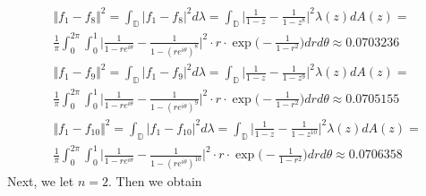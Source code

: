 \documentclass[12pt]{article}
\begin{document}
\begin{align}
&\Vert f_1 - f_8\Vert^2 = \int_\mathbb{D} \vert f_1 - f_8 \vert^2 d\lambda = \int_\mathbb{D} \bigg\vert \frac{1}{1-z} - \frac{1}{1-z^8} \bigg\vert^2 \lambda(z) dA(z) =\\
&\frac{1}{\pi} \int_0^{2\pi} \int_0^1 \bigg\vert \frac{1}{1-re^{i\theta}} - \frac{1}{1-(re^{i\theta})^8} \bigg\vert^2 \cdot r \cdot \exp\bigg(-\frac{1}{1-r^2}\bigg) dr d\theta \approx 0.0703236 \\
&\Vert f_1 - f_9\Vert^2 = \int_\mathbb{D} \vert f_1 - f_9 \vert^2 d\lambda = \int_\mathbb{D} \bigg\vert \frac{1}{1-z} - \frac{1}{1-z^9} \bigg\vert^2 \lambda(z) dA(z) =\\
&\frac{1}{\pi} \int_0^{2\pi} \int_0^1 \bigg\vert \frac{1}{1-re^{i\theta}} - \frac{1}{1-(re^{i\theta})^9} \bigg\vert^2 \cdot r \cdot \exp\bigg(-\frac{1}{1-r^2}\bigg) dr d\theta \approx 0.0705155 \\
&\Vert f_1 - f_{10}\Vert^2 = \int_\mathbb{D} \vert f_1 - f_{10} \vert^2 d\lambda = \int_\mathbb{D} \bigg\vert \frac{1}{1-z} - \frac{1}{1-z^{10}} \bigg\vert^2 \lambda(z) dA(z) =\\
&\frac{1}{\pi} \int_0^{2\pi} \int_0^1 \bigg\vert \frac{1}{1-re^{i\theta}} - \frac{1}{1-(re^{i\theta})^{10}} \bigg\vert^2 \cdot r \cdot \exp\bigg(-\frac{1}{1-r^2}\bigg) dr d\theta \approx 0.0706358
\end{align} Next, we let $n = 2$. Then we obtain
\end{document}
